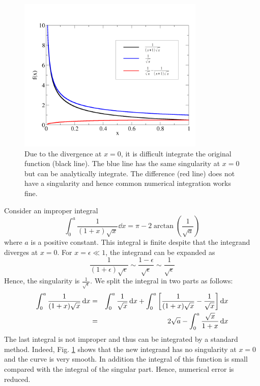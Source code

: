 \bigskip
\begin{example}
\label{ex:improper_int}
\begin{figure}[t]
\centerline{\includegraphics[width=3.5in]{03.integrals/improper_int_example.pdf}}
\caption{Due to the divergence at $x=0$, it is difficult integrate the original function (black line).  The blue line has the same singularity at $x=0$ but can be analytically integrate.  The difference (red line) does not have a singularity and hence common numerical integration works fine.}
\label{fig:improper_int}
\end{figure}

Consider an improper integral
\begin{equation}
\int_0^a \frac{1}{(1+x)\sqrt{x}} \dd{x} = \pi - 2 \arctan \left ( \frac{1}{\sqrt{a}} \right )
\label{eq:improper_int}
\end{equation}
where $a$ is a positive constant. This integral is finite despite that the integrand diverges at $x=0$. For $x=\epsilon\ll 1$, the integrand can be expanded as
\begin{equation}
\frac{1}{(1+\epsilon)\sqrt{\epsilon}} \sim \frac{1-\epsilon}{\sqrt{\epsilon}} \sim \frac{1}{\sqrt{\epsilon}}
\end{equation}
Hence, the singularity is $\displaystyle\frac{1}{\sqrt{\epsilon}}$. We split the integral in two parts as follows:
\begin{eqnarray}
\int_0^a \frac{1}{(1+x)\sqrt{x}}\, \text{d} x &=& \int_0^a \frac{1}{\sqrt{x}} \dd{x} + \int_0^a \left [ \frac{1}{(1+x)\sqrt{x}}
 - \frac{1}{\sqrt{x}} \right ] \dd{x} \nonumber \\
 &=& 2 \sqrt{a} - \int_0^a \frac{\sqrt{x}}{1+x} \dd{x} 
\end{eqnarray}
The last integral is not improper and thus can be integrated by a standard method. Indeed, Fig. \ref{fig:improper_int} shows that the new integrand has no singularity at $x=0$ and the curve is very smooth.  In addition the integral of this function is small compared with the integral of the singular part. Hence, numerical error is reduced.


\end{example}
